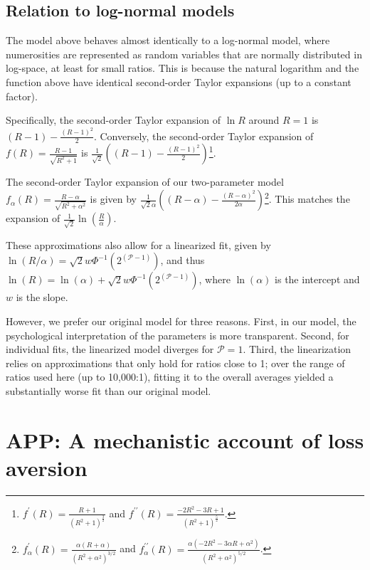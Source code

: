 \documentclass[
]{article}
\begin{document}
\subsection{Relation to log-normal models}\label{app:log-normal-approximations}

The model above behaves almost identically to a log-normal model, where numerosities are represented as random variables that are normally distributed in log-space, at least for small ratios. This is because the natural logarithm and the function above have identical second-order Taylor expansions (up to a constant factor).

Specifically, the second-order Taylor expansion of \(\ln R\) around \(R = 1\) is \((R - 1) - \frac{(R - 1)^2}{2}\). Conversely, the second-order Taylor expansion of \(f(R) = \frac{R-1}{\sqrt{R^2 + 1}}\) is \(\frac{1}{\sqrt{2}} \left( (R - 1) - \frac{(R - 1)^2}{2} \right)\)\footnote{\(f^\prime(R) = \frac{R+1}{(R^2 + 1)^{\frac{3}{2}}}\) and \(f^{\prime\prime}(R) = \frac{-2R^2 - 3R + 1}{(R^2 + 1)^{\frac{5}{2}}}\).}.

The second-order Taylor expansion of our two-parameter model \(f_\alpha(R) = \frac{R-\alpha}{\sqrt{R^2 + \alpha^2}}\) is given by \(\frac{1}{\sqrt{2} \alpha} \left( (R - \alpha) - \frac{(R-\alpha)^2}{2\alpha} \right)\)\footnote{\(f^\prime_\alpha(R) = \frac{\alpha (R + \alpha)}{(R^2 + \alpha^2)^{3/2}}\) and \(f^{\prime\prime}_\alpha(R) = \frac{\alpha \left(-2R^2 - 3\alpha R + \alpha^2\right)}{(R^2 + \alpha^2)^{5/2}}\).}. This matches the expansion of \(\frac{1}{\sqrt{2}}\ln\left(\frac{R}{\alpha}\right)\).

These approximations also allow for a linearized fit, given by \(\ln (R/\alpha) = \sqrt{2} w \Phi^{-1} (2^{(\mathcal{P}-1)})\), and thus \(\ln (R) = \ln(\alpha) + \sqrt{2} w \Phi^{-1} (2^{(\mathcal{P}-1)})\), where \(\ln(\alpha)\) is the intercept and \(w\) is the slope.

However, we prefer our original model for three reasons. First, in our model, the psychological interpretation of the parameters is more transparent. Second, for individual fits, the linearized model diverges for \(\mathcal{P} = 1\). Third, the linearization relies on approximations that only hold for ratios close to 1; over the range of ratios used here (up to 10,000:1), fitting it to the overall averages yielded a substantially worse fit than our original model.

\clearpage

\section{APP: A mechanistic account of loss aversion}\label{app:loss-aversion}
\end{document}
